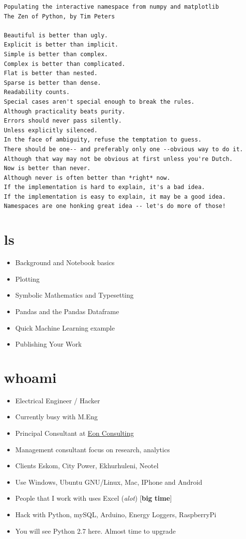 \documentclass{article}
\begin{document}
    \begin{Verbatim}[commandchars=\\\{\}]
Populating the interactive namespace from numpy and matplotlib
The Zen of Python, by Tim Peters

Beautiful is better than ugly.
Explicit is better than implicit.
Simple is better than complex.
Complex is better than complicated.
Flat is better than nested.
Sparse is better than dense.
Readability counts.
Special cases aren't special enough to break the rules.
Although practicality beats purity.
Errors should never pass silently.
Unless explicitly silenced.
In the face of ambiguity, refuse the temptation to guess.
There should be one-- and preferably only one --obvious way to do it.
Although that way may not be obvious at first unless you're Dutch.
Now is better than never.
Although never is often better than *right* now.
If the implementation is hard to explain, it's a bad idea.
If the implementation is easy to explain, it may be a good idea.
Namespaces are one honking great idea -- let's do more of those!
    \end{Verbatim}

    \section{ls}

\begin{itemize}
\itemsep1pt\parskip0pt
\item
  Background and Notebook basics
\item
  Plotting
\item
  Symbolic Mathematics and Typesetting
\item
  Pandas and the Pandas Dataframe
\item
  Quick Machine Learning example
\item
  Publishing Your Work
\end{itemize}

    \section{whoami}

\begin{itemize}
\item
  Electrical Engineer / Hacker
\item
  Currently busy with M.Eng
\item
  Principal Consultant at
  \href{http://www.eon.co.za/index.php/our-services-main/our-services/business-analytics}{Eon
  Consulting}
\item
  Management consultant focus on research, analytics
\item
  Clients Eskom, City Power, Ekhurhuleni, Neotel
\item
  Use Windows, Ubuntu GNU/Linux, Mac, IPhone and Android
\item
  People that I work with uses Excel (\emph{alot}) {[}\textbf{big
  time}{]}
\item
  Hack with Python, mySQL, Arduino, Energy Loggers, RaspberryPi
\item
  You will see Python 2.7 here. Almost time to upgrade
\end{itemize}
\end{document}
